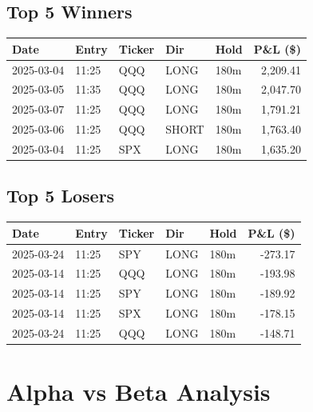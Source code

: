\documentclass[11pt,a4paper,twoside]{article}
\begin{document}
\subsection{Top 5 Winners}
\noindent\begin{center}
\begin{tabular}{>{\color{txtmain}}l llll r}
\toprule
\rowcolor{cardbg}
\textbf{Date} & \textbf{Entry} & \textbf{Ticker} & \textbf{Dir} & \textbf{Hold} & \textbf{P\&L (\$)} \\
\midrule
2025-03-04 & 11:25 & QQQ & LONG & 180m & \textcolor{wingreen}{2,209.41} \\
2025-03-05 & 11:35 & QQQ & LONG & 180m & \textcolor{wingreen}{2,047.70} \\
2025-03-07 & 11:25 & QQQ & LONG & 180m & \textcolor{wingreen}{1,791.21} \\
2025-03-06 & 11:25 & QQQ & SHORT & 180m & \textcolor{wingreen}{1,763.40} \\
2025-03-04 & 11:25 & SPX & LONG & 180m & \textcolor{wingreen}{1,635.20} \\
\bottomrule
\end{tabular}
\end{center}
\subsection{Top 5 Losers}
\noindent\begin{center}
\begin{tabular}{>{\color{txtmain}}l llll r}
\toprule
\rowcolor{cardbg}
\textbf{Date} & \textbf{Entry} & \textbf{Ticker} & \textbf{Dir} & \textbf{Hold} & \textbf{P\&L (\$)} \\
\midrule
2025-03-24 & 11:25 & SPY & LONG & 180m & \textcolor{lossred}{-273.17} \\
2025-03-14 & 11:25 & QQQ & LONG & 180m & \textcolor{lossred}{-193.98} \\
2025-03-14 & 11:25 & SPY & LONG & 180m & \textcolor{lossred}{-189.92} \\
2025-03-14 & 11:25 & SPX & LONG & 180m & \textcolor{lossred}{-178.15} \\
2025-03-24 & 11:25 & QQQ & LONG & 180m & \textcolor{lossred}{-148.71} \\
\bottomrule
\end{tabular}
\end{center}
\clearpage
\clearpage
\section{Alpha vs Beta Analysis}
\end{document}
